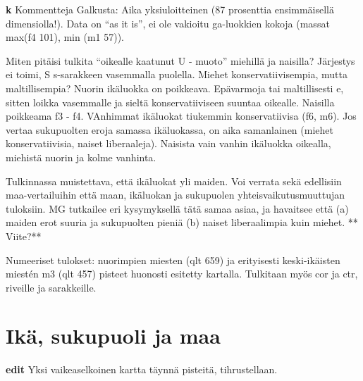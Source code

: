 \documentclass[
  finnish,
]{book}
\newenvironment{Shaded}{\begin{snugshade}}{\end{snugshade}}
\newcommand{\CommentTok}[1]{\textcolor[rgb]{0.56,0.35,0.01}{\textit{#1}}}
\newcommand{\DataTypeTok}[1]{\textcolor[rgb]{0.13,0.29,0.53}{#1}}
\newcommand{\KeywordTok}[1]{\textcolor[rgb]{0.13,0.29,0.53}{\textbf{#1}}}
\newcommand{\NormalTok}[1]{#1}
\newcommand{\StringTok}[1]{\textcolor[rgb]{0.31,0.60,0.02}{#1}}
\begin{document}
\textbf{k} Kommentteja Galkusta: Aika yksiuloitteinen (87 prosenttia
ensimmäisellä dimensiolla!). Data on ``as it is'', ei ole vakioitu
ga-luokkien kokoja (massat max(f4 101), min (m1 57)).

Miten pitäisi tulkita ``oikealle kaatunut U - muoto'' miehillä ja
naisilla? Järjestys ei toimi, S s-sarakkeen vasemmalla puolella. Miehet
konservatiivisempia, mutta maltillisempia? Nuorin ikäluokka on
poikkeava. Epävarmoja tai maltillisesti e, sitten loikka vasemmalle ja
sieltä konservatiiviseen suuntaa oikealle. Naisilla poikkeama f3 - f4.
VAnhimmat ikäluokat tiukemmin konservatiivisa (f6, m6). Jos vertaa
sukupuolten eroja samassa ikäluokassa, on aika samanlainen (miehet
konservatiivisia, naiset liberaaleja). Naisista vain vanhin ikäluokka
oikealla, miehistä nuorin ja kolme vanhinta.

Tulkinnassa muistettava, että ikäluokat yli maiden. Voi verrata sekä
edellisiin maa-vertailuihin että maan, ikäluokan ja sukupuolen
yhteisvaikutusmuuttujan tuloksiin. MG tutkailee eri kysymyksellä tätä
samaa asiaa, ja havaitsee että (a) maiden erot suuria ja sukupuolten
pieniä (b) naiset liberaalimpia kuin miehet. ** Viite?**

Numeeriset tulokset: nuorimpien miesten (qlt 659) ja erityisesti
keski-ikäisten miestén m3 (qlt 457) pisteet huonosti esitetty kartalla.
Tulkitaan myös cor ja ctr, riveille ja sarakkeille.

\hypertarget{ikuxe4-sukupuoli-ja-maa}{%
\section{Ikä, sukupuoli ja maa}\label{ikuxe4-sukupuoli-ja-maa}}

\begin{Shaded}
\end{Shaded}

\textbf{edit} Yksi vaikeaselkoinen kartta täynnä pisteitä,
tihrustellaan.
\end{document}
